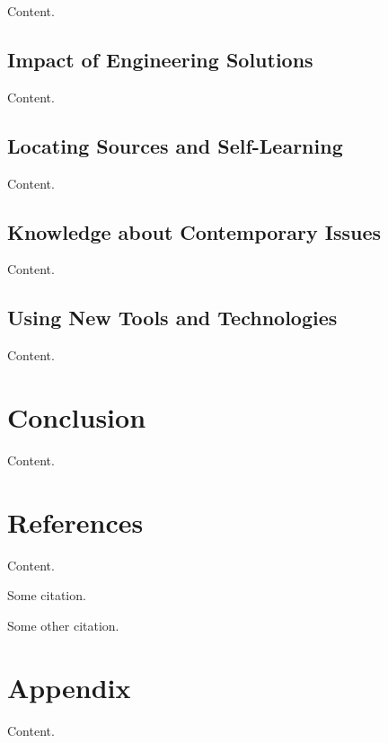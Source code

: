 \documentclass[10pt]{article}
\begin{document}
Content.

\subsection{Impact of Engineering Solutions}

Content. \cite{something}

\subsection{Locating Sources and Self-Learning}

Content.

\subsection{Knowledge about Contemporary Issues}

Content.

\subsection{Using New Tools and Technologies}

Content.

\section{Conclusion}

Content. \cite{another}

\section{References}

Content.

\begin{thebibliography}{99}

 Some citation.

 Some other citation.

\end{thebibliography}

\section{Appendix}

Content.
\end{document}
